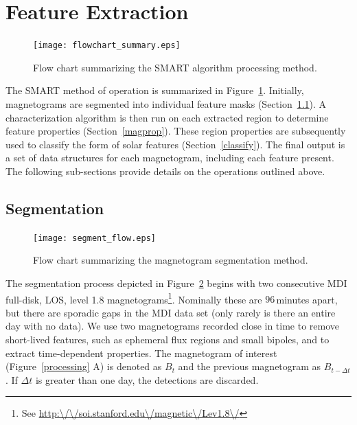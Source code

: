 \section{Feature Extraction}\label{algorithm}

\begin{figure}[!t]
\centerline{\texttt{[image: flowchart\_summary.eps]}}
\caption[The SMART method.]{Flow chart summarizing the SMART algorithm processing method.}
\label{flowsummary}
\end{figure}

The \gls{SMART} method of operation is summarized in Figure~\ref{flowsummary}. Initially, magnetograms are segmented into individual feature masks (Section~\ref{dataproc}). A characterization algorithm is then run on each extracted region to determine feature properties (Section~\ref{magprop}). These region properties are subsequently used to classify the form of solar features (Section~\ref{classify}).
The final output is a set of data structures for each magnetogram, including each feature present. The following sub-sections provide details on the operations outlined above.

\subsection{Segmentation}\label{dataproc}

\begin{figure}[!t]
\centerline{\texttt{[image: segment\_flow.eps]}}
\caption[The SMART segmentation method.]{Flow chart summarizing the magnetogram segmentation method.}
\label{segment}
\end{figure}

The segmentation process depicted in Figure~\ref{segment} begins with two consecutive \gls{MDI} full-disk, \gls{LOS}, level 1.8 magnetograms\footnote{See \url{http:\/\/soi.stanford.edu\/magnetic\/Lev1.8\/}}. 
Nominally these are $96$\,minutes apart, but there are sporadic gaps in the MDI data set (only rarely is there an entire day with no data). We use two magnetograms recorded close in time to remove short-lived features, such as ephemeral flux regions and small bipoles, and to extract time-dependent properties. The magnetogram of interest (Figure~\ref{processing} A) is denoted as $B_{t}$ and the previous magnetogram as $B_{t-\Delta t}$. If $\Delta t$ is greater than one day, the detections are discarded.


